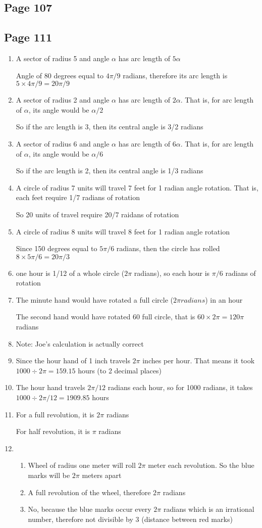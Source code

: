 \documentclass{article}
\newenvironment{solutions}[1]
{\subsection*{#1}
 \begin{enumerate}[leftmargin=1.5em]}
{\end{enumerate}}
\newcommand{\solution}{\item}
\newenvironment{subsolutions}
{\begin{enumerate}}
{\end{enumerate}}
\newcommand{\subsolution}{\item}
\begin{document}
\begin{solutions}{Page 107}
\begin{solutions}{Page 111}
\solution
A sector of radius 5 and angle $\alpha$ has arc length of $5\alpha$

Angle of 80 degrees equal to $4\pi/9$ radians, therefore its arc length is $5 \times 4\pi/9 = 20\pi/9$

\solution
A sector of radius 2 and angle $\alpha$ has arc length of $2\alpha$. That is, for arc length of $\alpha$, its angle would be $\alpha/2$ 

So if the arc length is 3, then its central angle is 3/2 radians

\solution
A sector of radius 6 and angle $\alpha$ has arc length of $6\alpha$. That is, for arc length of $\alpha$, its angle would be $\alpha/6$ 

So if the arc length is 2, then its central angle is 1/3 radians

\solution
A circle of radius 7 units will travel 7 feet for 1 radian angle rotation. That is, each feet require 1/7 radians of rotation

So 20 units of travel require 20/7 raidans of rotation

\solution
A circle of radius 8 units will travel 8 feet for 1 radian angle rotation

Since 150 degrees equal to $5\pi/6$ radians, then the circle has rolled $8 \times 5\pi/6 = 20\pi/3$

\solution
one hour is 1/12 of a whole circle ($2\pi$ radians), so each hour is $\pi/6$ radians of rotation

\solution
The minute hand would have rotated a full circle ($2\pi radians$) in an hour

The second hand would have rotated 60 full circle, that is $60 \times 2\pi = 120\pi$ radians

\solution
Note: Joe's calculation is actually correct

\solution
Since the hour hand of 1 inch travels $2\pi$ inches per hour. That means it took $1000 \div 2\pi = 159.15$ hours (to 2 decimal places)

\solution
The hour hand travels $2\pi/12$ radians each hour, so for 1000 radians, it takes $1000 \div 2\pi/12 = 1909.85$ hours

\solution
For a full revolution, it is $2\pi$ radians

For half revolution, it is $\pi$ radians

\solution
\begin{subsolutions}
\subsolution
Wheel of radius one meter will roll $2\pi$ meter each revolution. So the blue marks will be $2\pi$ meters apart
\subsolution
A full revolution of the wheel, therefore $2\pi$ radians
\subsolution
No, because the blue marks occur every $2\pi$ radians which is an irrational number, therefore not divisible by 3 (distance between red marks) 


\end{subsolutions}
\end{solutions}
\end{solutions}
\end{document}
